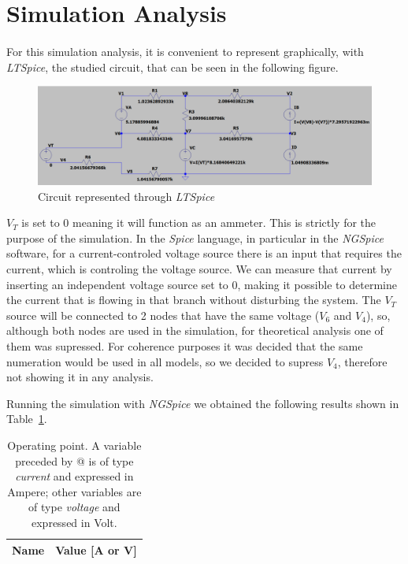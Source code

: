 \section{Simulation Analysis}
\label{sec:simulation}
\paragraph{}
\par For this simulation analysis, it is convenient to represent graphically, with  \textit{LTSpice}, the studied circuit, that can be seen in the following figure.

\begin{figure}[H]
    \includegraphics[width=0.8\linewidth]{CircuitLTSpice.png}
    \centering
    \caption{Circuit represented through \textit{LTSpice}}
    \label{circuitsim}
\end{figure}

\par $V_T$ is set to 0 meaning it will function as an ammeter. This is strictly for the purpose of the simulation. In the \textit{Spice} language, in particular in the \textit{NGSpice} software, for a current-controled voltage source there is an input that requires the current, which is controling the voltage source. We can measure that current by inserting an independent voltage source set to 0, making it possible to determine the current that is flowing in that branch without disturbing the system.
The $V_T$ source will be connected to 2 nodes that have the same voltage ($V_6$ and $V_4$), so, although both nodes are used in the simulation, for theoretical analysis one of them was supressed. For coherence purposes it was decided that the same numeration would be used in all models, so we decided to supress $V_4$, therefore not showing it in any analysis.


\par Running the simulation with \textit{NGSpice} we obtained the following results shown in Table~\ref{tab:op}. 

\begin{table}[H]
  \centering
  \begin{tabular}{|l|r|}
    \hline    
    {\bf Name} & {\bf Value [A or V]} \\ \hline
    
  \end{tabular}
  \caption{Operating point. A variable preceded by @ is of type {\em current}
    and expressed in Ampere; other variables are of type {\it voltage} and expressed in
    Volt.}
  \label{tab:op}
\end{table}

